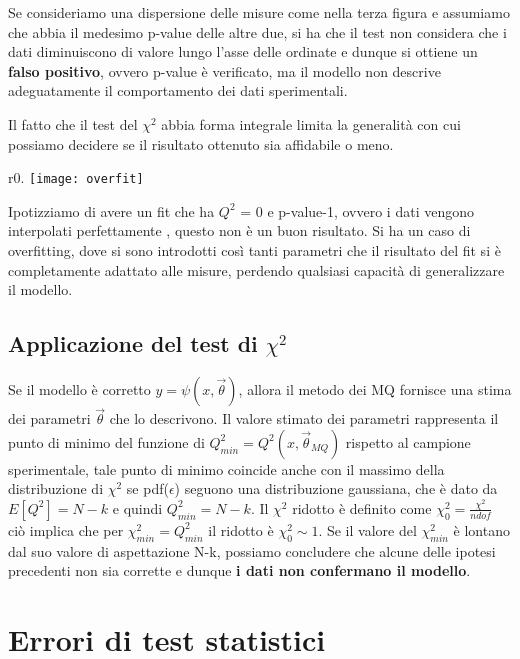 Se consideriamo una dispersione delle misure come nella terza figura e
assumiamo che abbia il medesimo p-value delle altre due, si ha
che il test non considera che i dati diminuiscono di valore lungo l'asse delle ordinate e dunque si ottiene un \textbf{falso positivo}, ovvero p-value \`{e} verificato, ma il modello non descrive adeguatamente il comportamento dei dati sperimentali.

Il fatto che il test del $\chi^2$ abbia forma integrale limita la generalit\`{a} con cui possiamo decidere se il risultato ottenuto sia affidabile o meno.

\begin{wrapfigure}{r}{0.\textwidth}
\centering
\texttt{[image: overfit]}	
\end{wrapfigure}

\noindent Ipotizziamo di avere un fit che ha $Q^2$ = 0 e p-value-1,
ovvero i dati vengono interpolati perfettamente , questo non è
un buon risultato. Si ha un caso di overfitting, dove si sono introdotti così tanti parametri che
il risultato del fit si \`{e} completamente adattato alle misure, perdendo qualsiasi
capacit\`{a} di generalizzare il modello. 

\subsection{Applicazione del test di $\chi^2$}

Se il modello \`{e} corretto $y = \psi(x,\vec{\theta})$, allora il metodo dei MQ fornisce una stima dei parametri $\vec{\theta}$ che lo descrivono. Il valore stimato dei parametri rappresenta il punto di minimo del funzione di $Q^2_{min} = Q^2(x,\vec{\theta}_{MQ})$ rispetto al campione sperimentale, tale punto di minimo coincide anche con il massimo della distribuzione di $\chi^2$ se pdf($\epsilon$) seguono una distribuzione gaussiana, che \`{e} dato da $E[Q^2] = N-k$ e quindi $Q^2_{min} = N-k$. \newline
Il $\chi^2$ ridotto \`{e} definito come $\chi^2_{0} = \frac{\chi^2}{ndof}$ ci\`{o} implica che per $\chi^2_{min} = Q^2_{min}$ il ridotto \`{e} $\chi^2_0 \sim 1$. \newline
Se il valore del $\chi^2_{min}$ \`{e} lontano dal suo valore di aspettazione N-k, possiamo concludere che alcune delle ipotesi precedenti non sia corrette e dunque \textbf{i dati non confermano il modello}.

\section{Errori di test statistici}

